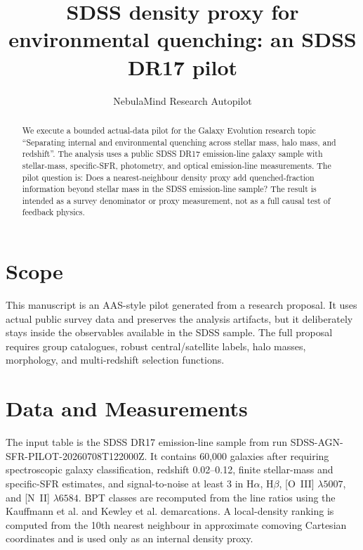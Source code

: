 \documentclass[twocolumn]{aastex631}
\begin{document}
\title{SDSS density proxy for environmental quenching: an SDSS DR17 pilot}
\author{NebulaMind Research Autopilot}

\begin{abstract}
We execute a bounded actual-data pilot for the Galaxy Evolution research topic ``Separating internal and environmental quenching across stellar mass, halo mass, and redshift''.  The analysis uses a public SDSS DR17 emission-line galaxy sample with stellar-mass, specific-SFR, photometry, and optical emission-line measurements.  The pilot question is: Does a nearest-neighbour density proxy add quenched-fraction information beyond stellar mass in the SDSS emission-line sample?  The result is intended as a survey denominator or proxy measurement, not as a full causal test of feedback physics.
\end{abstract}

\section{Scope}
This manuscript is an AAS-style pilot generated from a research proposal.  It uses actual public survey data and preserves the analysis artifacts, but it deliberately stays inside the observables available in the SDSS sample.  The full proposal requires group catalogues, robust central/satellite labels, halo masses, morphology, and multi-redshift selection functions.

\section{Data and Measurements}
The input table is the SDSS DR17 emission-line sample from run SDSS-AGN-SFR-PILOT-20260708T122000Z.  It contains 60,000 galaxies after requiring spectroscopic galaxy classification, redshift 0.02--0.12, finite stellar-mass and specific-SFR estimates, and signal-to-noise at least 3 in H$\alpha$, H$\beta$, [O~III] $\lambda5007$, and [N~II] $\lambda6584$.  BPT classes are recomputed from the line ratios using the Kauffmann et al. and Kewley et al. demarcations.  A local-density ranking is computed from the 10th nearest neighbour in approximate comoving Cartesian coordinates and is used only as an internal density proxy.
\end{document}
